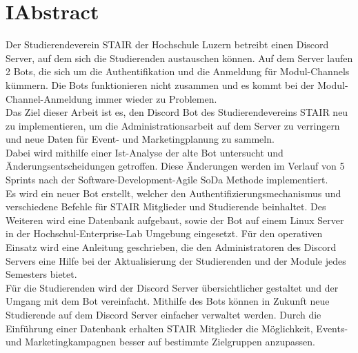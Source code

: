 \documentclass[a4paper, table]{article}
\begin{document}
\section*{I{\hspace*{1cm}}Abstract}
Der Studierendeverein \gls{STAIR} der Hochschule Luzern betreibt einen Discord Server, auf dem sich die Studierenden austauschen können. 
Auf dem Server laufen 2 Bots, die sich um die Authentifikation und die Anmeldung für Modul-Channels kümmern. 
Die Bots funktionieren nicht zusammen und es kommt bei der Modul-Channel-Anmeldung immer wieder zu Problemen.\\
Das Ziel dieser Arbeit ist es, den Discord Bot des Studierendevereins STAIR neu zu implementieren, um die Administrationsarbeit auf dem Server zu verringern und neue Daten für Event- und Marketingplanung zu sammeln.\\
Dabei wird mithilfe einer Ist-Analyse der alte Bot untersucht und Änderungsentscheidungen getroffen. 
Diese Änderungen werden im Verlauf von 5 Sprints nach der Software-Development-Agile \gls{SoDa} Methode implementiert.\\
Es wird ein neuer Bot erstellt, welcher den Authentifizierungsmechanismus und verschiedene Befehle für STAIR Mitglieder und Studierende beinhaltet. 
Des Weiteren wird eine Datenbank aufgebaut, sowie der Bot auf einem Linux Server in der Hochschul-Enterprise-Lab Umgebung eingesetzt. 
Für den operativen Einsatz wird eine Anleitung geschrieben, die den Administratoren des Discord Servers eine Hilfe bei der Aktualisierung der Studierenden und der Module jedes Semesters bietet. \\
Für die Studierenden wird der Discord Server übersichtlicher gestaltet und der Umgang mit dem Bot vereinfacht. 
Mithilfe des Bots können in Zukunft neue Studierende auf dem Discord Server einfacher verwaltet werden. 
Durch die Einführung einer Datenbank erhalten STAIR Mitglieder die Möglichkeit, Events- und Marketingkampagnen besser auf bestimmte Zielgruppen anzupassen.\\\\
\end{document}
